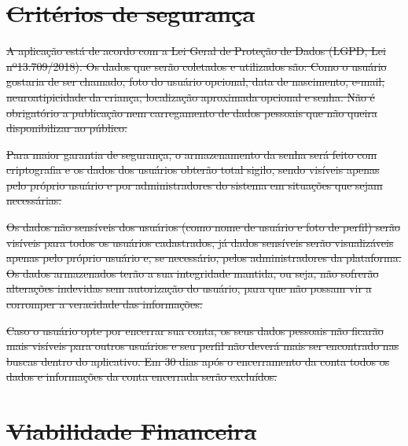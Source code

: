 \documentclass[
    12pt,               %
    openright,          %
    oneside,
    a4paper,            %
    paginasA3,  %
    BIBLATEX,           %
    REFINDENT,          %
    MODELO,             %
    TODO,               %
    english,            %
    brazil              %
    ]{ifsp-spo-inf-ctds} %
\providecommand{\DIFdel}[1]{{\protect\color{red}\sout{#1}}}                      %
\begin{document}
\begin{apendicesenv}
\chapter{\DIFdel{Critérios de segurança}}
\addtocounter{chapter}{-1}%

\DIFdel{A aplicação está de acordo com a Lei Geral de Proteção de Dados (LGPD, Lei nº13.709/2018). Os dados que serão coletados e utilizados são: Como o usuário gostaria de ser chamado, foto do usuário opcional, data de nascimento, e-mail, neuroatipicidade da criança, localização aproximada opcional e senha. Não é obrigatório a publicação nem carregamento de dados pessoais que não queira disponibilizar ao público. 
    }%

\DIFdel{Para maior garantia de segurança, o armazenamento da senha será feito com criptografia e os dados dos usuários obterão total sigilo, sendo visíveis apenas pelo próprio usuário e por administradores do sistema em situações que sejam necessárias. 
    }%

\DIFdel{Os dados não sensíveis dos usuários (como nome de usuário e foto de perfil) serão visíveis para todos os usuários cadastrados, já dados sensíveis serão visualizáveis apenas pelo próprio usuário e, se necessário, pelos administradores da plataforma. Os dados armazenados terão a sua integridade mantida, ou seja, não sofrerão alterações indevidas sem autorização do usuário, para que não possam vir a corromper a veracidade das informações. 
    }%

\DIFdel{Caso o usuário opte por encerrar sua conta, os seus dados pessoais não ficarão mais visíveis para outros usuários e seu perfil não deverá mais ser encontrado nas buscas dentro do aplicativo. Em 30 dias após o encerramento da conta todos os dados e informações da conta encerrada serão excluídos. 
}%


\chapter{\DIFdel{Viabilidade Financeira}}
\addtocounter{chapter}{-1}%

\end{apendicesenv}
\end{document}
